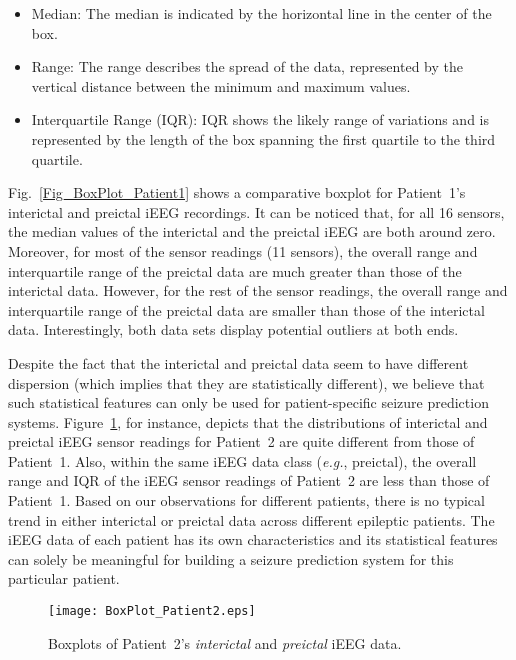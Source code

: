 \documentclass[journal]{IEEEtran}
\begin{document}
\begin{itemize}
	\item Median: The median is indicated by the horizontal line in the center of the box.
	\item Range: The range describes the spread of the data, represented by the vertical distance between the minimum and maximum values. 
	\item Interquartile Range (IQR): IQR shows the likely range of variations and is represented by the length of the box spanning the first quartile to the third quartile.
\end{itemize}



Fig.~\ref{Fig_BoxPlot_Patient1} shows a comparative boxplot for Patient~1’s interictal and preictal iEEG recordings. It can be noticed that, for all 16 sensors, the median values of the interictal and the preictal iEEG are both around zero. Moreover, for most of the sensor readings (11 sensors), the overall range and interquartile range of the preictal data are much greater than those of the interictal data. However, for the rest of the sensor readings, the overall range and interquartile range of the preictal data are smaller than those of the interictal data. Interestingly, both data sets display potential outliers at both ends.




Despite the fact that the interictal and preictal data seem to have different dispersion (which implies that they are statistically different), we believe that such statistical features can only be used for patient-specific seizure prediction systems. Figure~\ref{Fig_BoxPlot_Patient2}, for instance, depicts that the distributions of interictal and preictal iEEG sensor readings for Patient~2 are quite different from those of Patient~1. Also, within the same iEEG data class (\textit{e.g.}, preictal), the overall range and IQR of the iEEG sensor readings of Patient~2 are less than those of Patient~1. Based on our observations for different patients, there is no typical trend in either interictal or preictal data across different epileptic patients. The iEEG data of each patient has its own characteristics and its statistical features can solely be meaningful for building a seizure prediction system for this particular patient. 



\begin{figure}[!t]\centering
	\texttt{[image: BoxPlot\_Patient2.eps]}
	\caption{Boxplots of Patient~2’s \textit{interictal} and \textit{preictal} iEEG data.}
\label{Fig_BoxPlot_Patient2}
\end{figure}
\end{document}
